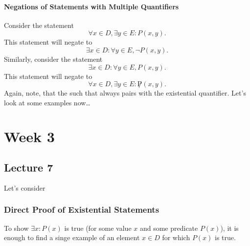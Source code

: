 \documentclass{report}
\begin{document}
\subsubsection*{Negations of Statements with Multiple Quantifiers}
Consider the statement
$$
	\forall x\in D, \exists y\in E: P(x,y).
$$
This statement will negate to
$$
	\exists x\in D:\forall y\in E, \lnot P(x,y).
$$
Similarly, consider the statement
$$
	\exists x\in D: \forall y\in E, P(x,y).
$$
This statement will negate to
$$
	\forall x\in D, \exists y\in E: \not P(x,y).
$$
Again, note, that the such that always pairs with the existential quantifier. Let's look at some examples now\dots
{}

\chapter{Week 3}
\section{Lecture 7}
Let's consider


\subsection*{Direct Proof of Existential Statements}
To show $\exists x: P(x)$ is true (for some value $x$ and some predicate $P(x)$), it is enough to find a singe example of an element $x\in D$ for which $P(x)$ is true.
\end{document}

